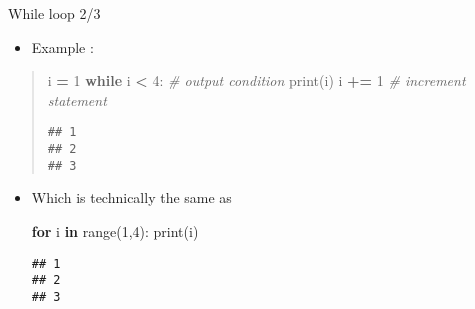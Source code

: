 \documentclass[
  8pt,
  ignorenonframetext,
]{beamer}
\newenvironment{Shaded}{\begin{snugshade}}{\end{snugshade}}
\newcommand{\BuiltInTok}[1]{#1}
\newcommand{\CommentTok}[1]{\textcolor[rgb]{0.56,0.35,0.01}{\textit{#1}}}
\newcommand{\ControlFlowTok}[1]{\textcolor[rgb]{0.13,0.29,0.53}{\textbf{#1}}}
\newcommand{\DecValTok}[1]{\textcolor[rgb]{0.00,0.00,0.81}{#1}}
\newcommand{\KeywordTok}[1]{\textcolor[rgb]{0.13,0.29,0.53}{\textbf{#1}}}
\newcommand{\NormalTok}[1]{#1}
\newcommand{\OperatorTok}[1]{\textcolor[rgb]{0.81,0.36,0.00}{\textbf{#1}}}
\providecommand{\tightlist}{%
  \setlength{\itemsep}{0pt}\setlength{\parskip}{0pt}}
\begin{document}
\begin{frame}[fragile]{While loop 2/3}
\protect\hypertarget{while-loop-23}{}
\begin{itemize}[<+->]
\tightlist
\item
  Example :
\end{itemize}

\begin{quote}
\begin{Shaded}
\begin{Highlighting}[]
\NormalTok{i }\OperatorTok{=} \DecValTok{1}
\ControlFlowTok{while}\NormalTok{ i }\OperatorTok{\textless{}} \DecValTok{4}\NormalTok{: }\CommentTok{\#  output condition}
  \BuiltInTok{print}\NormalTok{(i)}
\NormalTok{  i }\OperatorTok{+=} \DecValTok{1}     \CommentTok{\# increment statement}
\end{Highlighting}
\end{Shaded}

\begin{verbatim}
## 1
## 2
## 3
\end{verbatim}
\end{quote}

\begin{itemize}[<+->]
\item
  Which is technically the same as

\begin{Shaded}
\begin{Highlighting}[]
\ControlFlowTok{for}\NormalTok{ i }\KeywordTok{in} \BuiltInTok{range}\NormalTok{(}\DecValTok{1}\NormalTok{,}\DecValTok{4}\NormalTok{):}
  \BuiltInTok{print}\NormalTok{(i)}
\end{Highlighting}
\end{Shaded}

\begin{verbatim}
## 1
## 2
## 3
\end{verbatim}
\end{itemize}
\end{frame}
\end{document}
